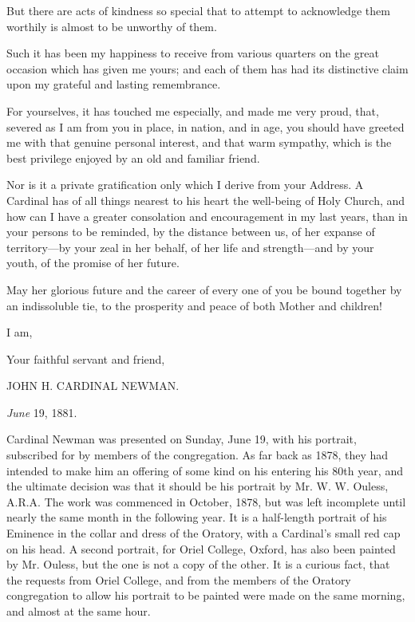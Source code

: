 But there are acts of kindness so special that to attempt to
acknowledge them worthily is almost to be unworthy of them.

Such it has been my happiness to receive from various quarters on
the great occasion which has given me yours; and each of them has had
its distinctive claim upon my grateful and lasting remembrance.

For yourselves, it has touched me especially, and made me very
proud, that, severed as I am from you in place, in nation, and in age,
you should have greeted me with that genuine personal interest,
and that warm sympathy, which is the best privilege enjoyed by an old
and familiar friend.

Nor is it a private gratification only which I derive from your
Address. A Cardinal has of all things nearest to his heart the
well-being of Holy Church, and how can I have a greater consolation
and encouragement in my last years, than in your persons to be
reminded, by the distance between us, of her expanse of territory—by
your zeal in her behalf, of her life and strength—and by your youth,
of the promise of her future.

May her glorious future and the career of every one of you be bound
together by an indissoluble tie, to the prosperity and peace of both
Mother and children!

I am,

Your faithful servant and friend,

JOHN H. CARDINAL NEWMAN.


\emph{June} 19, 1881.

Cardinal Newman was presented on Sunday, June 19, with
his portrait, subscribed for by members of the congregation. As far
back as 1878, they had intended to make him an
offering of some kind on his entering his 80th year, and the ultimate
decision was that it should be his portrait by Mr. W. W. Ouless, A.R.A.
The work was commenced in October, 1878, but was left incomplete until
nearly the same month in the following year. It is a half-length
portrait of his Eminence in the collar and dress of the Oratory, with
a Cardinal's small red cap on his head. A second portrait, for Oriel
College, Oxford, has also been painted by Mr. Ouless, but the one is
not a copy of the other. It is a curious fact, that the requests from
Oriel College, and from the members of the Oratory congregation to
allow his portrait to be painted were made on the same morning, and
almost at the same hour.

